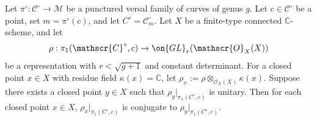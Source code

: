 \begin{lemma}
\notready\label{lemma:global-rigidity}
Let $\pi^\circ: \mathscr{C}^\circ\to \mathscr{M}$ be a punctured versal family
of curves of genus $g$. Let $c\in \mathscr{C}^\circ$ be a point, set
$m=\pi^\circ(c)$, and let $C^\circ=\mathscr{C}^\circ_m$. Let $X$ be a
finite-type connected $\mathbb{C}$-scheme, and let $$\rho:
\pi_1(\mathscr{C}^\circ, c)\to \on{GL}_r(\mathscr{O}_X(X))$$ be a representation
with $r<\sqrt{g+1}$ and constant determinant. For a closed point $x\in X$ with residue field
$\kappa(x)=\mathbb{C}$, let $\rho_x:=\rho\otimes_{\mathscr{O}_X(X)}\kappa(x)$.
Suppose there exists a closed point $y\in X$ such that $\rho_y|_{\pi_1(C^\circ,
c)}$ is unitary. Then for each
closed point $x\in X$, $\rho_{x}|_{\pi_1(C^\circ, c)}$ is conjugate to $\rho_y|_{\pi_1(C^\circ, c)}$.
\end{lemma}
